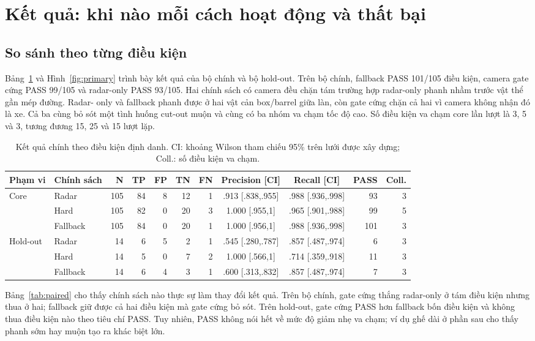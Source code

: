 \documentclass[conference]{IEEEtran}
\begin{document}
\section{Kết quả: khi nào mỗi cách hoạt động và thất bại}
\subsection{So sánh theo từng điều kiện}
Bảng~\ref{tab:primary} và Hình~\ref{fig:primary} trình bày kết quả của bộ
chính và bộ hold-out. Trên bộ chính, fallback PASS 101/105 điều kiện, camera
gate cứng PASS 99/105 và radar-only PASS 93/105. Hai chính sách có camera đều
chặn tám trường hợp radar-only phanh nhầm trước vật thể gần mép đường. Radar-
only và fallback phanh được ở hai vật cản box/barrel giữa làn, còn gate cứng
chặn cả hai vì camera không nhận đó là xe. Cả ba cùng bỏ sót một tình huống
cut-out muộn và cùng có ba nhóm va chạm tốc độ cao. Số điều kiện va chạm core
lần lượt là 3, 5 và 3, tương đương 15, 25 và 15 lượt lặp.

\begin{table}[t]
\caption{Kết quả chính theo điều kiện định danh. CI: khoảng Wilson tham chiếu 95\% trên lưới được xây dựng; Coll.: số điều kiện va chạm.}
\label{tab:primary}
\centering\scriptsize
\setlength{\tabcolsep}{3pt}
\begin{tabular}{llrrrrrccrr}
\toprule Phạm vi & Chính sách & N & TP & FP & TN & FN & Precision [CI] & Recall [CI] & PASS & Coll.\\
\midrule
Core & Radar & 105 & 84 & 8 & 12 & 1 & .913 [.838,.955] & .988 [.936,.998] & 93 & 3\\
 & Hard & 105 & 82 & 0 & 20 & 3 & 1.000 [.955,1] & .965 [.901,.988] & 99 & 5\\
 & Fallback & 105 & 84 & 0 & 20 & 1 & 1.000 [.956,1] & .988 [.936,.998] & 101 & 3\\
\midrule
Hold-out & Radar & 14 & 6 & 5 & 2 & 1 & .545 [.280,.787] & .857 [.487,.974] & 6 & 3\\
 & Hard & 14 & 5 & 0 & 7 & 2 & 1.000 [.566,1] & .714 [.359,.918] & 11 & 3\\
 & Fallback & 14 & 6 & 4 & 3 & 1 & .600 [.313,.832] & .857 [.487,.974] & 7 & 3\\
\bottomrule
\end{tabular}
\end{table}

Bảng~\ref{tab:paired} cho thấy chính sách nào thực sự làm thay đổi kết quả.
Trên bộ chính, gate cứng thắng radar-only ở tám điều kiện nhưng thua ở hai;
fallback giữ được cả hai điều kiện mà gate cứng bỏ sót. Trên hold-out, gate
cứng PASS hơn fallback bốn điều kiện và không thua điều kiện nào theo tiêu chí
PASS. Tuy nhiên, PASS không nói hết về mức độ giảm nhẹ va chạm; ví dụ ghế dài
ở phần sau cho thấy phanh sớm hay muộn tạo ra khác biệt lớn.
\end{document}
